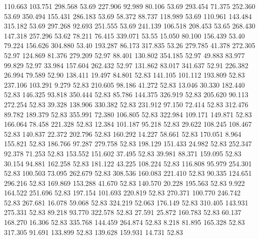  110.663  103.751  298.568        53.69
 227.906   92.989   80.106        53.69
 293.454   71.375  252.360        53.69
 350.494  155.431  286.183        53.69
  58.372   88.737  118.989        53.69
 110.961  143.484  315.182        53.69
 297.268   92.693  251.555        53.69
 241.139  106.518  208.453        53.65
 268.430  147.318  257.296        53.62
  78.211   76.415  339.071        53.55
  15.050   80.100  156.439        53.40
  79.224  156.626  304.880        53.40
 193.287   86.173  317.835        53.26
 279.785   41.378  272.305        52.97
 124.869   81.376  279.209        52.97
  88.401  130.802  354.185        52.97
  49.883   83.977   99.829        52.97
  33.984  157.604  262.432        52.97
 131.862   83.017  341.637        52.91
 226.382   26.994   79.589        52.90
 138.411   19.497   84.801        52.83
 141.105  101.112  193.809        52.83
 237.106  103.291    9.279        52.83
 210.605   98.186   41.272        52.83
  13.046   30.330  182.440        52.83
 146.325   93.818  350.444        52.83
  85.786  144.375  326.919        52.83
 205.620   90.113  272.254        52.83
  39.328  138.906  330.382        52.83
 231.912   97.150   72.414        52.83
 312.476   89.782  189.379        52.83
 355.991   72.380  106.805        52.83
 322.984  109.171  149.871        52.83
 166.064   78.458  221.328        52.83
  12.384  101.187   95.218        52.83
  29.622  108.245  108.467        52.83
 140.837   22.372  202.796        52.83
 160.292   14.227   58.661        52.83
 170.051    8.964  155.821        52.83
 186.766   97.287  279.758        52.83
 198.129  151.433   24.982        52.83
 252.347   92.378   71.253        52.83
 153.552  151.602   37.495        52.83
  39.981   88.371  159.095        52.83
  30.154   94.881  162.258        52.83
 181.122   43.225  108.224        52.83
 116.808   95.979  254.301        52.83
 100.503   73.095  262.679        52.83
 308.536  160.083  221.410        52.83
  90.335  124.651  296.216        52.83
 169.869  153.288   41.670        52.83
 140.570   20.228  195.563        52.83
   9.922  164.522  251.696        52.83
 197.154  101.693  220.819        52.83
 270.371  100.770  246.742        52.83
 267.681   16.078   59.068        52.83
 324.219   52.063  176.149        52.83
 310.405  143.931  275.331        52.83
  89.218   93.770  322.578        52.83
  27.591   25.872  160.783        52.83
  60.137  168.270   16.306        52.83
 335.768  144.459  264.874        52.83
   8.218   81.895  165.328        52.83
 317.305   91.691  133.899        52.83
 139.628  159.931   14.731        52.83
